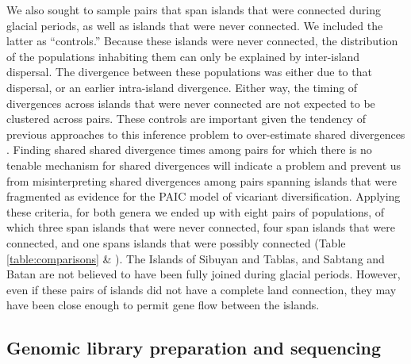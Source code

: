 We also sought to sample pairs that span islands that were connected during
glacial periods, as well as islands that were never connected.
We included the latter as ``controls.''
Because these islands were never connected, the distribution of the populations
inhabiting them can only be explained by inter-island dispersal.
The divergence between these populations was either due to that
dispersal, or an earlier intra-island divergence.
Either way, the timing of divergences across islands that were never connected
are not expected to be clustered across pairs.
These controls are important given the tendency of previous approaches to this
inference problem to over-estimate shared divergences
\citep{Oaks2012,Oaks2014reply}.
Finding shared shared divergence times among pairs for which there is no
tenable mechanism for shared divergences will indicate a problem and prevent us
from misinterpreting shared divergences among pairs spanning islands that were
fragmented as evidence for the PAIC model of vicariant diversification.
Applying these criteria, for both genera we ended up with eight pairs of
populations, of which three span islands that were never connected, four span
islands that were connected, and one spans islands that were possibly connected
(Table \ref{table:comparisons} \& ).
The Islands of Sibuyan and Tablas, and Sabtang and Batan are not believed to
have been fully joined during glacial periods.
However, even if these pairs of islands did not have a complete land
connection, they may have been close enough to permit gene flow between the
islands.

\ifembed{

}{}

\subsection{Genomic library preparation and sequencing}

